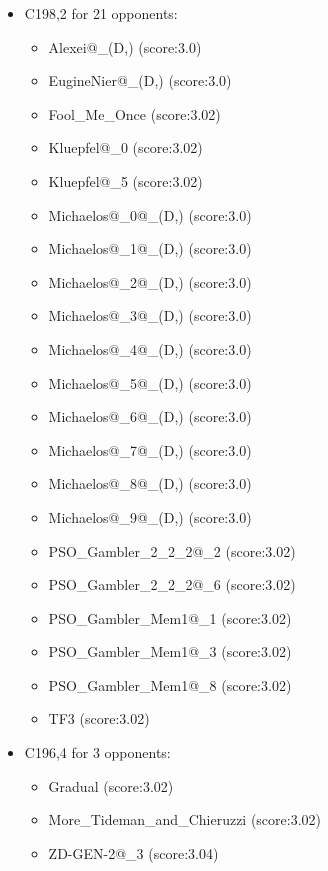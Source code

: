 \begin{appendices}
\begin{itemize}
        \item C198,2 for 21 opponents:
        \begin{multicols}{3}
            \begin{itemize}
                \item Alexei@\_(D,) (score:3.0)
                \item EugineNier@\_(D,) (score:3.0)
                \item Fool\_Me\_Once (score:3.02)
                \item Kluepfel@\_0 (score:3.02)
                \item Kluepfel@\_5 (score:3.02)
                \item Michaelos@\_0@\_(D,) (score:3.0)
                \item Michaelos@\_1@\_(D,) (score:3.0)
                \item Michaelos@\_2@\_(D,) (score:3.0)
                \item Michaelos@\_3@\_(D,) (score:3.0)
                \item Michaelos@\_4@\_(D,) (score:3.0)
                \item Michaelos@\_5@\_(D,) (score:3.0)
                \item Michaelos@\_6@\_(D,) (score:3.0)
                \item Michaelos@\_7@\_(D,) (score:3.0)
                \item Michaelos@\_8@\_(D,) (score:3.0)
                \item Michaelos@\_9@\_(D,) (score:3.0)
                \item PSO\_Gambler\_2\_2\_2@\_2 (score:3.02)
                \item PSO\_Gambler\_2\_2\_2@\_6 (score:3.02)
                \item PSO\_Gambler\_Mem1@\_1 (score:3.02)
                \item PSO\_Gambler\_Mem1@\_3 (score:3.02)
                \item PSO\_Gambler\_Mem1@\_8 (score:3.02)
                \item TF3 (score:3.02)
            \end{itemize}
        \end{multicols}

        \item C196,4 for 3 opponents:
        \begin{multicols}{3}
            \begin{itemize}
                \item Gradual (score:3.02)
                \item More\_Tideman\_and\_Chieruzzi (score:3.02)
                \item ZD-GEN-2@\_3 (score:3.04)
            \end{itemize}
        \end{multicols}


\end{itemize}
\end{appendices}
